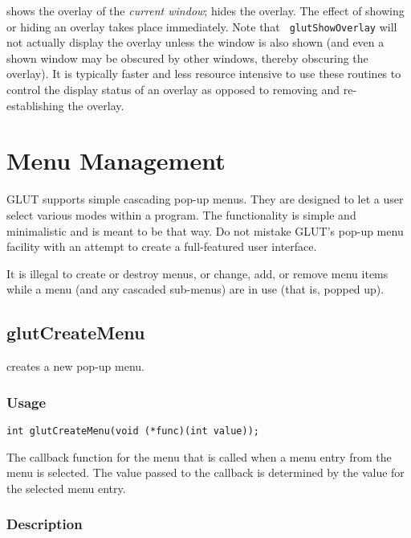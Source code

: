  shows the overlay of the {\em current window};
 hides the overlay.  The effect of showing or
hiding an overlay takes place immediately.  Note that {\tt
glutShowOverlay} will not actually display the overlay unless the
window is also shown (and even a shown window may be obscured by other
windows, thereby obscuring the overlay).  It is typically faster and
less resource intensive to use these routines to control the display
status of an overlay as opposed to removing and re-establishing the
overlay.

\section{Menu Management}

GLUT supports simple cascading pop-up menus.  They are designed to let a user
select various modes within a program.  The functionality
is simple and minimalistic and is meant to be that way.  Do not mistake GLUT's pop-up
menu facility with an attempt to create a full-featured user interface.

It is illegal to create or destroy menus, or change, add, or remove menu
items while a menu (and any cascaded sub-menus) are in use (that is,
popped up).

\subsection{glutCreateMenu}

 creates a new pop-up menu.

\subsubsection*{Usage}

\begin{verbatim}
int glutCreateMenu(void (*func)(int value));
\end{verbatim}
\begin{description}
\itemsep 0in
\item[{\tt func}]
The callback function for the menu that is called when a menu
entry from the menu is selected.  The value passed to the callback
is determined by the value for the selected menu entry.
\end{description}

\subsubsection*{Description}

